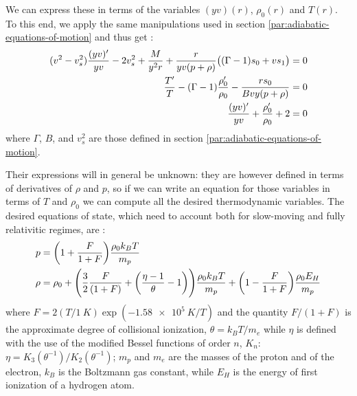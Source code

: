 \documentclass[main.tex]{subfiles}
\begin{document}
We can express these in terms of the variables \((yv)(r)\), \(\rho_0(r)\) and \(T(r)\).
To this end, we apply the same manipulations used in section \ref{par:adiabatic-equations-of-motion} and thus get \cite[eqs. 15]{NobiliTurollaZampieri:1991dec}:
%
\begin{subequations} \label{eq:simplified-full-equations-of-motion}
\begin{align}
  (v^2 - v_s^2) \frac{(yv) ^{\prime}}{yv} - 2 v_s^2 + \frac{M}{y^2 r}
  + \frac{r}{yv (p + \rho)} \qty((\Gamma-1)s_0 + v s_1) &= 0  \\
  \frac{T ^{\prime}}{T} - (\Gamma - 1)\frac{\rho_0 ^{\prime}}{\rho_0} - \frac{r s_0}{Bvy (p+\rho)}  &= 0  \\
  \frac{(yv) ^{\prime}}{yv} + \frac{\rho_0 ^{\prime}}{\rho_0} + 2 &=0
\end{align}
\end{subequations}
%
where \(\Gamma\), \(B\), and \(v_s^2\) are those defined in section \ref{par:adiabatic-equations-of-motion}.
%

Their expressions will in general be unknown: they are however defined in terms of derivatives of \(\rho\) and \(p\), so if we can write an equation for those variables in terms of \(T\) and \(\rho_0\) we can compute all the desired thermodynamic variables. The desired equations of state, which need to account both for slow-moving and fully relativitic regimes, are \cite[eqs. 16]{NobiliTurollaZampieri:1991dec}:
%
\begin{subequations}
\begin{align}
  p &= \qty(1 + \frac{F}{1+F}) \frac{\rho_0 k_B T}{m_p}  \\
  \rho &= \rho_0 +  \qty( \frac{3}{2} \frac{F}{(1+F)} + \qty(\frac{\eta-1}{\theta} - 1)) \frac{\rho_0 k_B T}{m_p} + \qty(1 - \frac{F}{1+F} ) \frac{\rho_0 E_H}{m_p}
\end{align}
\end{subequations}
%
where \(F = 2 (T/\SI{1}{K}) \exp(\SI{-1.58e5}{K}/T)\) and the quantity \(F/(1+F)\) is the approximate degree of collisional ionization, \(\theta = k_B T / m_e\) while \(\eta\) is defined with the use of the modified Bessel functions of order \(n\), \(K_n\):  \(\eta = K_3 (\theta^{-1}) / K_2 (\theta^{-1})\); \(m_p\) and \(m_e\) are the masses of the proton and of the electron, \(k_B\) is the Boltzmann gas constant, while \(E_H\) is the energy of first ionization of a hydrogen atom.
\end{document}
